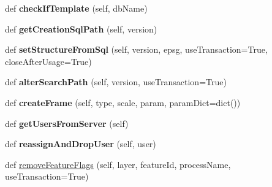 \begin{DoxyCompactItemize}
\item 
\mbox{\label{class_dsg_tools_1_1_factories_1_1_db_factory_1_1postgis_db_1_1_postgis_db_aa5b2b9f1d4856dee7b328fbe5733cdc7}} 
def {\bfseries check\+If\+Template} (self, db\+Name)
\item 
\mbox{\label{class_dsg_tools_1_1_factories_1_1_db_factory_1_1postgis_db_1_1_postgis_db_aaf575513b315e40c6b4325e635cd0106}} 
def {\bfseries get\+Creation\+Sql\+Path} (self, version)
\item 
\mbox{\label{class_dsg_tools_1_1_factories_1_1_db_factory_1_1postgis_db_1_1_postgis_db_affc8ffb2b4fda04968dd1e7b595d7707}} 
def {\bfseries set\+Structure\+From\+Sql} (self, version, epsg, use\+Transaction=True, close\+After\+Usage=True)
\item 
\mbox{\label{class_dsg_tools_1_1_factories_1_1_db_factory_1_1postgis_db_1_1_postgis_db_aeee342e62b95e57cf3e50eb0f10a22d1}} 
def {\bfseries alter\+Search\+Path} (self, version, use\+Transaction=True)
\item 
\mbox{\label{class_dsg_tools_1_1_factories_1_1_db_factory_1_1postgis_db_1_1_postgis_db_a1aa72c8a1a9266dec394fd0cdac9b64c}} 
def {\bfseries create\+Frame} (self, type, scale, param, param\+Dict=dict())
\item 
\mbox{\label{class_dsg_tools_1_1_factories_1_1_db_factory_1_1postgis_db_1_1_postgis_db_afe60279d6c52f6f3452cb03fa11cb5ba}} 
def {\bfseries get\+Users\+From\+Server} (self)
\item 
\mbox{\label{class_dsg_tools_1_1_factories_1_1_db_factory_1_1postgis_db_1_1_postgis_db_a14c86c0e7a03fc562d294548d7d9c059}} 
def {\bfseries reassign\+And\+Drop\+User} (self, user)
\item 
def \mbox{\hyperlink{class_dsg_tools_1_1_factories_1_1_db_factory_1_1postgis_db_1_1_postgis_db_ad204ec1c3548517d893e6b3f5af9594f}{remove\+Feature\+Flags}} (self, layer, feature\+Id, process\+Name, use\+Transaction=True)

\end{DoxyCompactItemize}
